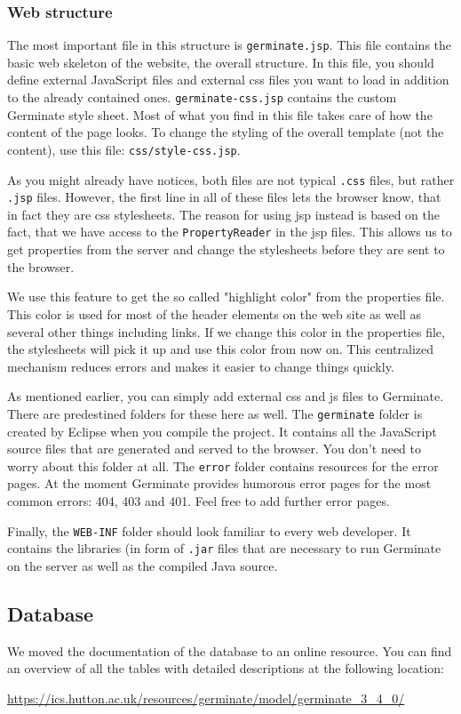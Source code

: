 \subsubsection{Web structure}
The most important file in this structure is \texttt{germinate.jsp}. This file contains the basic web skeleton of the website, \ie the overall structure. In this file, you should define external JavaScript files and external css files you want to load in addition to the already contained ones. \texttt{germinate-css.jsp} contains the custom Germinate style sheet. Most of what you find in this file takes care of how the content of the page looks. To change the styling of the overall template (not the content), use this file: \texttt{css/style-css.jsp}.

As you might already have notices, both files are not typical \texttt{.css} files, but rather \texttt{.jsp} files. However, the first line in all of these files lets the browser know, that in fact they are css stylesheets. The reason for using jsp instead is based on the fact, that we have access to the \texttt{PropertyReader} in the jsp files. This allows us to get properties from the server and change the stylesheets before they are sent to the browser.

We use this feature to get the so called "highlight color" from the properties file. This color is used for most of the header elements on the web site as well as several other things including links. If we change this color in the properties file, the stylesheets will pick it up and use this color from now on. This centralized mechanism reduces errors and makes it easier to change things quickly.

As mentioned earlier, you can simply add external css and js files to Germinate. There are predestined folders for these here as well. The \texttt{germinate} folder is created by Eclipse when you compile the project. It contains all the JavaScript source files that are generated and served to the browser. You don't need to worry about this folder at all. The \texttt{error} folder contains resources for the error pages. At the moment Germinate provides humorous error pages for the most common errors: 404, 403 and 401. Feel free to add further error pages.

Finally, the \texttt{WEB-INF} folder should look familiar to every web developer. It contains the libraries (in form of \texttt{.jar} files that are necessary to run Germinate on the server as well as the compiled Java source. 

\subsection{Database}
\label{sec:structure-database}

We moved the documentation of the database to an online resource. You can find an overview of all the tables with detailed descriptions at the following location:
\begin{center}
	\url{https://ics.hutton.ac.uk/resources/germinate/model/germinate_3_4_0/}
\end{center}